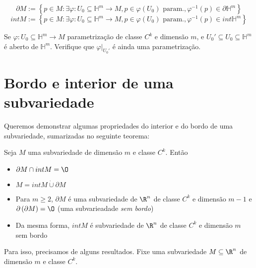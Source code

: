 
\begin{previouslyseen}
    \[
    \partial M := \left\{ p \in M : \exists \varphi : U_0\subseteq\mathbb{H}^{m} \longrightarrow M, p \in \varphi \left( U_0 \right) \text{ param.}, \varphi ^{-1}\left( p \right) \in \partial \mathbb{H}^{m} \right\} 
    \] \[
    int M := \left\{ p \in M : \exists \varphi : U_0\subseteq\mathbb{H}^{m} \longrightarrow M, p \in \varphi \left( U_0 \right) \text{ param.}, \varphi ^{-1}\left( p \right) \in int \mathbb{H}^{m} \right\} 
    \] 
\end{previouslyseen}

\begin{problem}
    Se $\varphi : U_0 \subseteq\mathbb{H}^{m} \longrightarrow M$ parametrização de classe $C^{k}$ e dimensão $m$, e $U_0' \subseteq U_0 \subseteq \mathbb{H}^{m}$ é aberto de $\mathbb{H}^{m}$. Verifique que $\varphi \Big|_{U_0'}$ é ainda uma parametrização.
\end{problem}


\section*{Bordo e interior de uma subvariedade}

Queremos demonstrar algumas propriedades do interior e do bordo de uma subvariedade, sumarizadas no seguinte teorema:
\begin{theorem}
    Seja $M$ uma subvariedade de dimensão $m$ e classe $C^{k}$. Então
    \begin{itemize}
        \item $\partial M \cap int M = \O$
	\item $M = int M \dot{\cup } \partial M$
	\item Para $m\ge 2$, $\partial M$ é uma subvariedade de $\R^{n}$ de classe $C^{k}$ e dimensão $m-1$ e $\partial \left( \partial M \right) = \O$ (uma subvarieadade \emph{sem bordo})
	\item Da mesma forma, $int M$ é subvariedade de $\R^{n}$ de classe $C^{k}$ e dimensão $m$ sem bordo
    \end{itemize}
\end{theorem}

Para isso, precisamos de alguns resultados. Fixe uma subvariedade $M\subseteq\R^{n}$ de dimensão $m$ e classe $C^{k}$.

